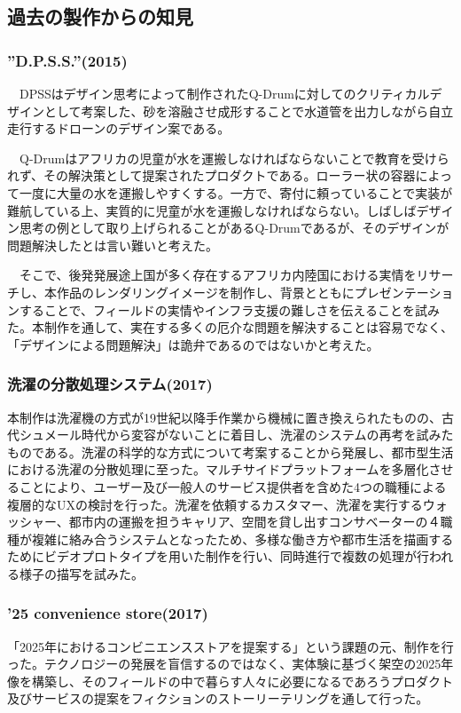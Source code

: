 \newpage
\subsection{過去の製作からの知見}

\subsubsection{”D.P.S.S.”(2015)}
　DPSSはデザイン思考によって制作されたQ-Drumに対してのクリティカルデザインとして考案した、砂を溶融させ成形することで水道管を出力しながら自立走行するドローンのデザイン案である。

　Q-Drumはアフリカの児童が水を運搬しなければならないことで教育を受けられず、その解決策として提案されたプロダクトである。ローラー状の容器によって一度に大量の水を運搬しやすくする。一方で、寄付に頼っていることで実装が難航している上、実質的に児童が水を運搬しなければならない。しばしばデザイン思考の例として取り上げられることがあるQ-Drumであるが、そのデザインが問題解決したとは言い難いと考えた。

　そこで、後発発展途上国が多く存在するアフリカ内陸国における実情をリサーチし、本作品のレンダリングイメージを制作し、背景とともにプレゼンテーションすることで、フィールドの実情やインフラ支援の難しさを伝えることを試みた。本制作を通して、実在する多くの厄介な問題を解決することは容易でなく、「デザインによる問題解決」は詭弁であるのではないかと考えた。

\subsubsection{洗濯の分散処理システム(2017)}

 本制作は洗濯機の方式が19世紀以降手作業から機械に置き換えられたものの、古代シュメール時代から変容がないことに着目し、洗濯のシステムの再考を試みたものである。洗濯の科学的な方式について考案することから発展し、都市型生活における洗濯の分散処理に至った。マルチサイドプラットフォームを多層化させることにより、ユーザー及び一般人のサービス提供者を含めた4つの職種による複層的なUXの検討を行った。洗濯を依頼するカスタマー、洗濯を実行するウォッシャー、都市内の運搬を担うキャリア、空間を貸し出すコンサベーターの４職種が複雑に絡み合うシステムとなったため、多様な働き方や都市生活を描画するためにビデオプロトタイプを用いた制作を行い、同時進行で複数の処理が行われる様子の描写を試みた。

\subsubsection{’25 convenience store(2017)}
 「2025年におけるコンビニエンスストアを提案する」という課題の元、制作を行った。テクノロジーの発展を盲信するのではなく、実体験に基づく架空の2025年像を構築し、そのフィールドの中で暮らす人々に必要になるであろうプロダクト及びサービスの提案をフィクションのストーリーテリングを通して行った。

